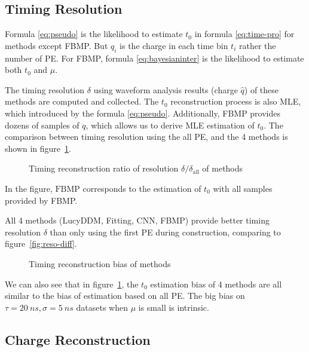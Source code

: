 \subsection{Timing Resolution}
\label{subsec:timeresolution}


Formula \eqref{eq:pseudo} is the likelihood to estimate $t_{0}$ in formula \eqref{eq:time-pro} for methods except FBMP. But $q_{i}$ is the charge in each time bin $t_{i}$ rather the number of PE. For FBMP, formula \eqref{eq:bayesianinter} is the likelihood to estimate both $t_{0}$ and $\mu$. 

The timing resolution $\delta$ using waveform analysis results (charge $\hat{q}$) of these methods are computed and collected. The $t_{0}$ reconstruction process is also MLE, which introduced by the formula \eqref{eq:pseudo}. Additionally, FBMP provides dozens of samples of $q$, which allows us to derive MLE estimation of $t_{0}$. The comparison between timing resolution using the all PE, and the 4 methods is shown in figure~\ref{fig:deltamethods}. 

\begin{figure}[H]
    \centering
    \resizebox{\textwidth}{!}{}
    \caption{\label{fig:deltamethods} Timing reconstruction ratio of resolution $\delta/\delta_{\mathrm{all}}$ of methods}
\end{figure}

In the figure, $\mathrm{FBMP}$ corresponds to the estimation of $t_{0}$ with all samples provided by FBMP. 

All 4 methods (LucyDDM, Fitting, CNN, FBMP) provide better timing resolution $\delta$ than only using the first PE during construction, comparing to figure~\ref{fig:reso-diff}. 

\begin{figure}[H]
    \centering
    \resizebox{\textwidth}{!}{}
    \caption{\label{fig:biasmethods}Timing reconstruction bias of methods}
\end{figure}

We can also see that in figure~\ref{fig:deltamethods}, the $t_0$ estimation bias of 4 methods are all similar to the bias of estimation based on all PE. The big bias on $\tau=\SI{20}{ns}, \sigma=\SI{5}{ns}$ datasets when $\mu$ is small is intrinsic. 

\subsection{Charge Reconstruction}
\label{subsec:chargereconstruction}

